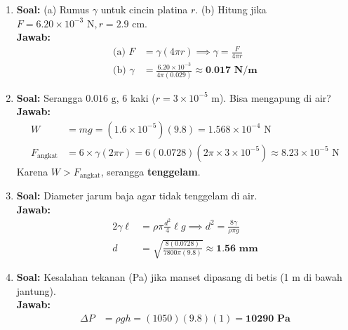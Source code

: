 \documentclass[twocolumn]{article}
\begin{document}
\begin{enumerate}
    \item \textbf{Soal:} (a) Rumus $\gamma$ untuk cincin platina $r$. (b) Hitung jika $F = 6.20 \times 10^{-3} \text{ N}, r = 2.9 \text{ cm}$. \\
    \textbf{Jawab:}
    \begin{align*}
        \text{(a) } F &= \gamma(4\pi r) \implies \gamma = \frac{F}{4\pi r} \\
        \text{(b) } \gamma &= \frac{6.20 \times 10^{-3}}{4\pi(0.029)} \approx \textbf{0.017 N/m}
    \end{align*}

    \item \textbf{Soal:} Serangga $0.016 \text{ g}$, 6 kaki ($r = 3 \times 10^{-5} \text{ m}$). Bisa mengapung di air? \\
    \textbf{Jawab:}
    \begin{align*}
        W &= mg = (1.6 \times 10^{-5})(9.8) = 1.568 \times 10^{-4} \text{ N} \\
        F_{\text{angkat}} &= 6 \times \gamma(2\pi r) = 6(0.0728)(2\pi \times 3 \times 10^{-5}) \approx 8.23 \times 10^{-5} \text{ N}
    \end{align*}
    Karena $W > F_{\text{angkat}}$, serangga \textbf{tenggelam}.

    \item \textbf{Soal:} Diameter jarum baja agar tidak tenggelam di air. \\
    \textbf{Jawab:}
    \begin{align*}
        2 \gamma \ell &= \rho \pi \frac{d^2}{4} \ell g \implies d^2 = \frac{8 \gamma}{\rho \pi g} \\
        d &= \sqrt{\frac{8(0.0728)}{7800\pi(9.8)}} \approx \textbf{1.56 mm}
    \end{align*}

    \item \textbf{Soal:} Kesalahan tekanan (Pa) jika manset dipasang di betis (1 m di bawah jantung). \\
    \textbf{Jawab:}
    \begin{align*}
        \Delta P &= \rho g h = (1050)(9.8)(1) = \textbf{10290 Pa}
    \end{align*}

\end{enumerate}
\end{document}
